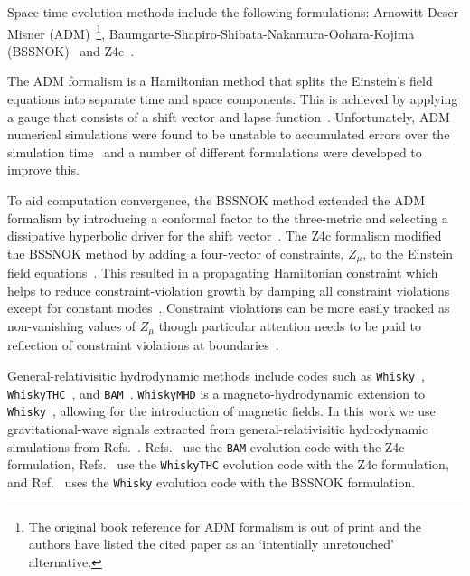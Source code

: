 \documentclass[../Thesis.tex]{subfiles}
\begin{document}
    Space-time evolution methods include the following formulations: Arnowitt-Deser-Misner (ADM)~\cite{Arnowitt2008}\footnote{The original book reference for ADM formalism is out of print and the authors have listed the cited paper as an `intentially unretouched' alternative.},  Baumgarte-Shapiro-Shibata-Nakamura-Oohara-Kojima (BSSNOK)~\cite{Nakamura1987,Shibata1995,Baumgarte1999,Alcubierre2000} and Z4c~\cite{Bona2003,Bona2004,Gundlach2005,Bernuzzi2010,Hilditch2013}. 
    
    The ADM formalism is a Hamiltonian method that splits the Einstein's field equations into separate time and space components.
    This is achieved by applying a gauge that consists of a shift vector and lapse function~\cite{Arnowitt2008}.
    Unfortunately, ADM numerical simulations were found to be unstable to accumulated errors over the simulation time~\cite{Brandt2000,Kidder2001,Alcubierre2001a} and a number of different formulations were developed to improve this. \par
    
    To aid computation convergence, the BSSNOK method extended the ADM formalism by introducing a conformal factor to the three-metric and selecting a dissipative hyperbolic driver for the  shift vector~\cite{Nakamura1987,Shibata1995,Nakamura1999,Shibata1999,Baumgarte1999,Alcubierre2000,Alcubierre2001}. 
    The Z4c formalism modified the BSSNOK method by adding a four-vector of constraints, $Z_\mu$, to the Einstein field equations~\cite{Bona2003,Bona2004,Gundlach2005,Bernuzzi2010,Hilditch2013}. 
    This resulted in a propagating Hamiltonian constraint which helps to reduce constraint-violation growth by damping all constraint violations  except for constant modes~\cite{Gundlach2005}.
    Constraint violations can be more easily tracked as non-vanishing values of $Z_\mu$ though particular attention needs to be paid to reflection of constraint violations at boundaries~\cite{Bernuzzi2010,Ruiz2011,Hilditch2013}.  \par
    
    

    
    General-relativisitic hydrodynamic methods include codes such as \texttt{Whisky}~\cite{Baiotti2005}, \texttt{WhiskyTHC}~\cite{Baiotti2005,Radice2014,Radice2014b,Radice2015}, and \texttt{BAM}~\cite{Brugmann2004,Brugmann2008,Thierfelder2011,Dietrich2015,Bernuzzi2016b,Dietrich2019a}. 
    \texttt{WhiskyMHD} is a magneto-hydrodynamic extension to \texttt{Whisky}~\cite{Giacomazzo2007,Giacomazzo2011,Giacomazzo2013}, allowing for the introduction of magnetic fields.
    In this work we use gravitational-wave signals extracted from general-relativisitic hydrodynamic simulations from Refs.~\cite{Bernuzzi2014,Rezzolla2016,Radice2016,Dietrich2017b,Radice2017,Radice2017a,Radice2018,Dietrich2018}. 
    Refs.~\cite{Bernuzzi2014,Dietrich2017b} use the \texttt{BAM}  evolution code with the Z4c formulation, Refs.~\cite{Radice2016,Radice2017,Radice2017a,Radice2018} use the \texttt{WhiskyTHC} evolution code with the Z4c formulation, and Ref.~\cite{Rezzolla2016} uses the \texttt{Whisky} evolution code with the BSSNOK formulation. \par 
    
\end{document}
